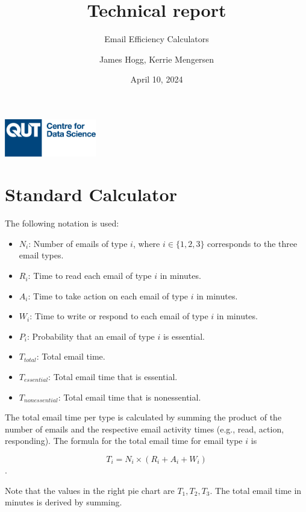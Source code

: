 \documentclass[
  reportpaper,
  DIV=11,
  numbers=noendperiod]{scrartcl}
\title{Technical report}
\subtitle{Email Efficiency Calculators}
\author{James Hogg, Kerrie Mengersen}
\date{April 10, 2024}
\providecommand{\tightlist}{%
  \setlength{\itemsep}{0pt}\setlength{\parskip}{0pt}}\usepackage{longtable,booktabs,array}
\begin{document}
\maketitle

\begin{center}
\includegraphics[width=0.3\textwidth]{../ed/static/ed/CDS-Logo-Blue.png}
\end{center}

\newpage{}

\section{Standard Calculator}\label{standard-calculator}

The following notation is used:

\begin{itemize}
\tightlist
\item
  \(N_i\): Number of emails of type \(i\), where \(i \in \{1,2,3\}\)
  corresponds to the three email types.
\item
  \(R_i\): Time to read each email of type \(i\) in minutes.
\item
  \(A_i\): Time to take action on each email of type \(i\) in minutes.
\item
  \(W_i\): Time to write or respond to each email of type \(i\) in
  minutes.
\item
  \(P_i\): Probability that an email of type \(i\) is essential.
\item
  \(T_{total}\): Total email time.
\item
  \(T_{essential}\): Total email time that is essential.
\item
  \(T_{nonessential}\): Total email time that is nonessential.
\end{itemize}

The total email time per type is calculated by summing the product of
the number of emails and the respective email activity times (e.g.,
read, action, responding). The formula for the total email time for
email type \(i\) is

\[ T_i = N_i \times (R_i + A_i + W_i) \].

Note that the values in the right pie chart are \(T_1,T_2,T_3\). The
total email time in minutes is derived by summing.
\end{document}
